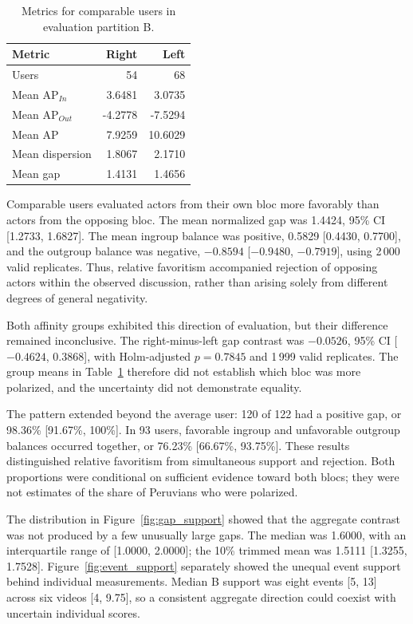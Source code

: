 \documentclass[conference, letterpaper]{IEEEtran}
\begin{document}
\begin{table}[t]
\centering\small
\caption{Metrics for comparable users in evaluation partition B.}
\label{tab:ap_spread}
\begin{tabular}{lrr}\toprule
Metric & Right & Left\\\midrule
Users & 54 & 68\\
Mean AP$_{In}$ & 3.6481 & 3.0735\\
Mean AP$_{Out}$ & -4.2778 & -7.5294\\
Mean AP & 7.9259 & 10.6029\\
Mean dispersion & 1.8067 & 2.1710\\
Mean gap & 1.4131 & 1.4656\\
\bottomrule\end{tabular}
\end{table}

Comparable users evaluated actors from their own bloc more favorably than actors from the opposing bloc. The mean normalized gap was 1.4424, 95\% CI [1.2733, 1.6827]. The mean ingroup balance was positive, 0.5829 [0.4430, 0.7700], and the outgroup balance was negative, $-0.8594$ [$-0.9480$, $-0.7919$], using 2\,000 valid replicates. Thus, relative favoritism accompanied rejection of opposing actors within the observed discussion, rather than arising solely from different degrees of general negativity.

Both affinity groups exhibited this direction of evaluation, but their difference remained inconclusive. The right-minus-left gap contrast was $-0.0526$, 95\% CI [$-0.4624$, 0.3868], with Holm-adjusted $p=0.7845$ and 1\,999 valid replicates. The group means in Table~\ref{tab:ap_spread} therefore did not establish which bloc was more polarized, and the uncertainty did not demonstrate equality.

The pattern extended beyond the average user: 120 of 122 had a positive gap, or 98.36\% [91.67\%, 100\%]. In 93 users, favorable ingroup and unfavorable outgroup balances occurred together, or 76.23\% [66.67\%, 93.75\%]. These results distinguished relative favoritism from simultaneous support and rejection. Both proportions were conditional on sufficient evidence toward both blocs; they were not estimates of the share of Peruvians who were polarized.

The distribution in Figure~\ref{fig:gap_support} showed that the aggregate contrast was not produced by a few unusually large gaps. The median was 1.6000, with an interquartile range of [1.0000, 2.0000]; the 10\% trimmed mean was 1.5111 [1.3255, 1.7528]. Figure~\ref{fig:event_support} separately showed the unequal event support behind individual measurements. Median B support was eight events [5, 13] across six videos [4, 9.75], so a consistent aggregate direction could coexist with uncertain individual scores.
\end{document}
